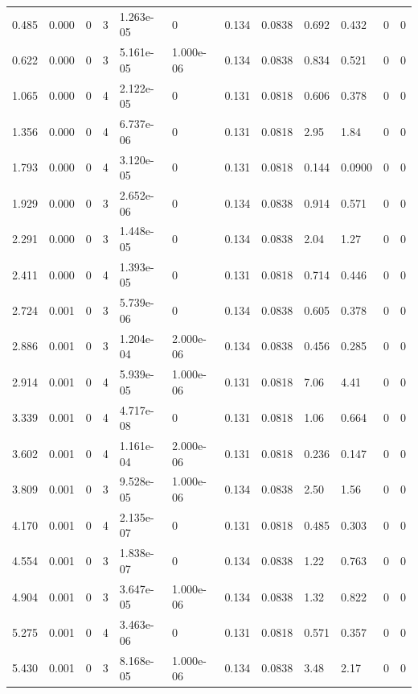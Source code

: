 \documentclass[preview]{standalone}
\begin{document}
{{\begin{tabular}{L{1.2cm}C{1.2cm} C{0.3cm}C{0.5cm} C{1.4cm}C{1.4cm} C{1.4cm}C{1.4cm} C{1.6cm}C{1.6cm} C{1.6cm}C{1.6cm}}
  0.485  &  0.000  & 0     &  3 &  1.263e-05  & 0  &  0.134&   0.0838& 0.692 & 0.432   &  0 & 0  \\ 
  0.622  &  0.000  & 0     &  3 &  5.161e-05  & 1.000e-06  &  0.134&   0.0838& 0.834 & 0.521   &  0 & 0  \\ 
  1.065  &  0.000  & 0     &  4 &  2.122e-05  & 0  &  0.131&   0.0818& 0.606 & 0.378   &  0 & 0  \\ 
  1.356  &  0.000  & 0     &  4 &  6.737e-06  & 0  &  0.131&   0.0818& 2.95 & 1.84   &  0 & 0  \\ 
  1.793  &  0.000  & 0     &  4 &  3.120e-05  & 0  &  0.131&   0.0818& 0.144 & 0.0900   &  0 & 0  \\ 
  1.929  &  0.000  & 0     &  3 &  2.652e-06  & 0  &  0.134&   0.0838& 0.914 & 0.571   &  0 & 0  \\ 
  2.291  &  0.000  & 0     &  3 &  1.448e-05  & 0  &  0.134&   0.0838& 2.04 & 1.27   &  0 & 0  \\ 
  2.411  &  0.000  & 0     &  4 &  1.393e-05  & 0  &  0.131&   0.0818& 0.714 & 0.446   &  0 & 0  \\ 
  2.724  &  0.001  & 0     &  3 &  5.739e-06  & 0  &  0.134&   0.0838& 0.605 & 0.378   &  0 & 0  \\ 
  2.886  &  0.001  & 0     &  3 &  1.204e-04  & 2.000e-06  &  0.134&   0.0838& 0.456 & 0.285   &  0 & 0  \\ 
  2.914  &  0.001  & 0     &  4 &  5.939e-05  & 1.000e-06  &  0.131&   0.0818& 7.06 & 4.41   &  0 & 0  \\ 
  3.339  &  0.001  & 0     &  4 &  4.717e-08  & 0  &  0.131&   0.0818& 1.06 & 0.664   &  0 & 0  \\ 
  3.602  &  0.001  & 0     &  4 &  1.161e-04  & 2.000e-06  &  0.131&   0.0818& 0.236 & 0.147   &  0 & 0  \\ 
  3.809  &  0.001  & 0     &  3 &  9.528e-05  & 1.000e-06  &  0.134&   0.0838& 2.50 & 1.56   &  0 & 0  \\ 
  4.170  &  0.001  & 0     &  4 &  2.135e-07  & 0  &  0.131&   0.0818& 0.485 & 0.303   &  0 & 0  \\ 
  4.554  &  0.001  & 0     &  3 &  1.838e-07  & 0  &  0.134&   0.0838& 1.22 & 0.763   &  0 & 0  \\ 
  4.904  &  0.001  & 0     &  3 &  3.647e-05  & 1.000e-06  &  0.134&   0.0838& 1.32 & 0.822   &  0 & 0  \\ 
  5.275  &  0.001  & 0     &  4 &  3.463e-06  & 0  &  0.131&   0.0818& 0.571 & 0.357   &  0 & 0  \\ 
  5.430  &  0.001  & 0     &  3 &  8.168e-05  & 1.000e-06  &  0.134&   0.0838& 3.48 & 2.17   &  0 & 0  \\ 

\end{tabular}}}
\end{document}

